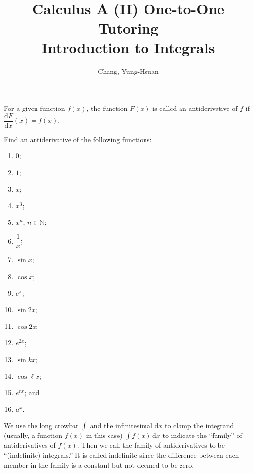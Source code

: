 \documentclass[11pt]{article}
\title{\textbf{Calculus A (II) One-to-One Tutoring}\\ \Large Introduction to Integrals}
\author{Chang, Yung-Hsuan}
\theoremstyle{break}
\theoremstyle{no_label}
\newcommand{\derivative}[2]{\dfrac{\dd{#1}}{\dd{#2}}}
\newcommand{\dd}{\text{d}}
\newcommand{\ddi}{\text{$\,$d}}
\newcommand{\bbN}{\mathbb{N}}
\numberwithin{equation}{theorem}
\begin{document}
\maketitle

\begin{definition}[Antiderivative]
    For a given function $f(x)$, the function $F(x)$ is called an antiderivative of $f$ if $\derivative{F}{x}(x)=f(x)$.
\end{definition}

\begin{example}
    Find an antiderivative of the following functions: \vspace{-1em}
    \begin{multicols}{4}
        \begin{enumerate}
            \item $0$;
            \item $1$;
            \item $x$;
            \item $x^3$;
            \item $x^n$, $n\in\bbN$;
            \item $\dfrac{1}{x}$;
            \item $\sin x$;
            \item $\cos x$;
            \item $e^x$;
            \item $\sin 2x$;
            \item $\cos 2x$;
            \item $e^{2x}$;
            \item $\sin kx$;
            \item $\cos \ell x$;
            \item $e^{rx}$; and
            \item $a^x$.
        \end{enumerate}
    \end{multicols}
\end{example}


\begin{remark}
    We use the long crowbar $\displaystyle\int$ and the infinitesimal $\dd x$ to clamp the integrand (usually, a function $f(x)$ in this case) $\displaystyle\int f(x)\ddi x$ to indicate the ``family'' of antiderivatives of $f(x)$. Then we call the family of antiderivatives to be ``(indefinite) integrals.'' It is called indefinite since the difference between each member in the family is a constant but not deemed to be zero.
\end{remark}
\end{document}

